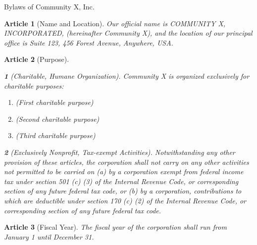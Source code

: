 \newtheorem{art}{Article}
\newtheorem{asec}{}[art]


Bylaws of Community X, Inc.


\begin{art}[Name and Location]

Our official name is COMMUNITY X, INCORPORATED, (hereinafter
Community X), and the location of our principal office is Suite
123, 456 Forest Avenue, Anywhere, USA.

\end{art}

\begin{art}[Purpose] ~

\begin{asec}[Charitable, Humane Organization]


Community X is organized exclusively for charitable purposes:
\begin{enumerate}
\item (First charitable purpose)
\item (Second charitable purpose)
\item (Third charitable purpose)
\end{enumerate}
\end{asec}

\begin{asec}[Exclusively Nonprofit, Tax-exempt Activities]

Notwithstanding any other provision of these articles, the
corporation shall not carry on any other activities not permitted
to be carried on (a) by a corporation exempt from federal income
tax under section 501 (c) (3) of the Internal Revenue Code, or
corresponding section of any future federal tax code, or (b) by a
corporation, contributions to which are deductible under section
170 (c) (2) of the Internal Revenue Code, or corresponding section
of any future federal tax code.

\end{asec}
\end{art}

\begin{art}[Fiscal Year]

The fiscal year of the corporation shall run from January 
1 until December 31.

\end{art}


